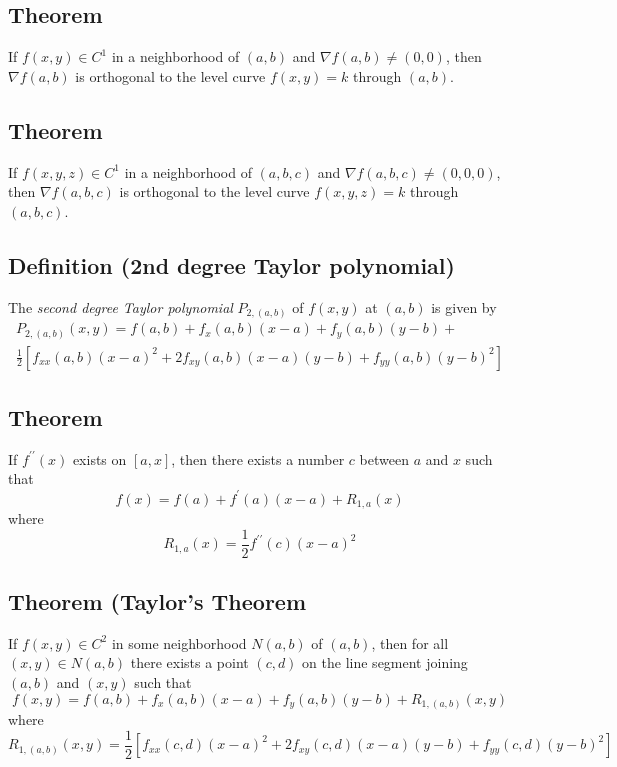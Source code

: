 \begin{thmbox}
\subsection{Theorem}
If $ f(x,y)\in C^1 $ in a neighborhood of $ (a,b) $ and
$ \nabla f(a,b)\neq (0,0) $, then $ \nabla f(a,b) $ is
orthogonal to the level curve $ f(x,y)=k $ through
$ (a,b) $.
\end{thmbox}

\begin{thmbox}
\subsection{Theorem}
If $ f(x,y,z)\in C^1 $ in a neighborhood of $ (a,b,c) $ and
$ \nabla f(a,b,c)\neq (0,0,0) $, then $ \nabla f(a,b,c) $ is
orthogonal to the level curve $ f(x,y,z)=k $ through
$ (a,b,c) $.
\end{thmbox}

\begin{defbox}
\subsection{Definition (2nd degree Taylor polynomial)}
The \emph{second degree Taylor polynomial} $ P_{2,(a,b)} $ 
of $ f(x,y) $ at $ (a,b) $ is given by
\[
\begin{aligned}
P_{2,(a,b)}(x,y)=
f(a,b)+f_x(a,b)(x-a)+f_y(a,b)(y-b)+\\
\frac{1}{2} [f_{xx}(a,b)(x-a)^2+2f_{x y}(a,b)(x-a)(y-b)+
f_{yy}(a,b)(y-b)^2]
\end{aligned}
\]
\end{defbox}

\begin{thmbox}
\subsection{Theorem}
If $ f^{\prime\prime}(x) $ exists on $ [a,x] $, then there exists
a number $ c $ between $ a $ and $ x $ such that
\[ f(x)=f(a)+f^\prime (a)(x-a)+R_{1,a}(x) \]
where
\[ R_{1,a}(x)=\frac{1}{2} f^{\prime\prime}(c)(x-a)^2 \]
\end{thmbox}

\begin{thmbox}
\subsection{Theorem (Taylor's Theorem}
If $ f(x,y)\in C^2 $ in some neighborhood $ N(a,b) $ of
$ (a,b) $, then for all $ (x,y)\in N(a,b) $ there
exists a point $ (c,d) $ on the line segment joining
$ (a,b) $ and $ (x,y) $ such that
\[ f(x,y)=f(a,b)+f_x(a,b)(x-a)+f_y(a,b)(y-b)+R_{1,(a,b)}(x,y) \]
where
\[ R_{1,(a,b)}(x,y)=\frac{1}{2}
[f_{xx}(c,d)(x-a)^2+2f_{x y}(c,d)(x-a)(y-b)+f_{yy}(c,d)(y-b)^2] \]
\end{thmbox}

